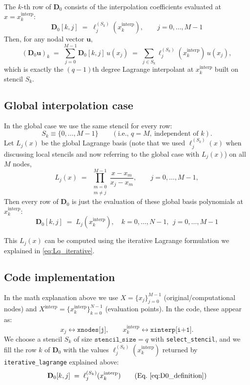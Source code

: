 The \(k\)-th row of \(\mathbf{D}_0\) consists of the interpolation coefficients evaluated at \(x=x^{\text{interp}}_k\):
\begin{equation}
\boxed{\;
\mathbf{D}_0[k,j] \;=\; \ell^{(S_k)}_j(x^{\text{interp}}_k), \qquad j=0,\dots,M-1
\;}
\label{eq:D0_definition}
\end{equation}
Then, for any nodal vector \(\mathbf{u}\),
\begin{equation}
(\mathbf{D}_0 \mathbf{u})_k
\;=\;
\sum_{j=0}^{M-1} \mathbf{D}_0[k,j]\,u(x_j)
\;=\;
\sum_{j\in S_k} \ell^{(S_k)}_j(x^{\text{interp}}_k)\,u(x_j),
\label{eq:row_action}
\end{equation}
which is exactly the \((q-1)\)th degree Lagrange interpolant at \(x^{\text{interp}}_k\) built on stencil \(S_k\).


\subsection*{Global interpolation case}
In the global case we use the same stencil for every row:
\[
S_k \equiv \{0,\dots,M-1\} \qquad (\text{i.e., } q=M,\ \text{independent of }k).
\]
Let \(L_j(x)\) be the global Lagrange basis (note that we used \(\ell^{(S_k)}_j(x)\) when discussing local stencils and now referring to the global case with \(L_j(x)\)) on all \(M\) nodes,
\begin{equation}
L_j(x) \;=\; \prod_{\substack{m=0\\ m\neq j}}^{M-1} \frac{x-x_m}{x_j-x_m},
\qquad j=0,\dots,M-1,
\label{eq:global_lagrange}
\end{equation}
Then every row of \(\mathbf{D}_0\) is just the evaluation of these global basis polynomials at \(x^{\text{interp}}_k\):
\begin{equation}
\boxed{\;
\mathbf{D}_0[k,j] \;=\; L_j(x^{\text{interp}}_k),
\quad k=0,\dots,N-1,\ \ j=0,\dots,M-1
\;}
\label{eq:D0_global_def}
\end{equation}


This \(L_j(x)\) can be computed using the iterative Lagrange formulation we explained in \eqref{eq:Lq_iterative}.

\clearpage

\subsection*{Code implementation}


In the math explanation above we use \(X=\{x_j\}_{j=0}^{M-1}\) (original/computational nodes) and
\(X^{\text{interp}}=\{x^{\text{interp}}_k\}_{k=0}^{N-1}\) (evaluation points).  
In the code, these appear as:
\[
x_j \leftrightarrow \texttt{xnodes[j]}, \qquad
x^{\text{interp}}_k \leftrightarrow \texttt{xinterp[i+1]}.
\]
We choose a stencil \(S_k\) of size \(\texttt{stencil\_size}=q\) with
\texttt{select\_stencil}, and we fill the row \(k\) of \(\mathbf{D}_0\) with the values
\(\ell^{(S_k)}_j(x^{\text{interp}}_k)\) returned by \texttt{iterative\_lagrange} explained above:
\[
\mathbf{D}_0[k,j] \;=\; \ell^{(S_k)}_j(x^{\text{interp}}_k)\qquad\text{(Eq.~\eqref{eq:D0_definition})}
\]



